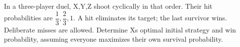 In a three-player duel, X,Y,Z shoot cyclically in that order. Their hit probabilities are $\dfrac{1}{3},\dfrac{2}{3},1$. A hit eliminates its target; the last survivor wins. Deliberate misses are allowed. Determine X\textquotesingle s optimal initial strategy and win probability, assuming everyone maximizes their own survival probability.
